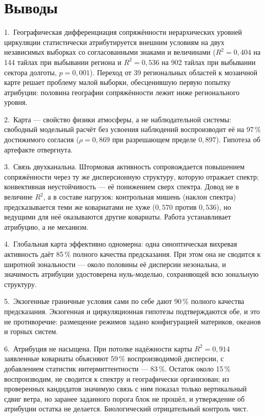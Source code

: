 \documentclass[11pt,a4paper]{article}
\begin{document}
\section{Выводы}
\label{sec:conclusion}

1.~Географическая дифференциация сопряжённости иерархических уровней циркуляции статистически атрибутируется внешним условиям на двух независимых выборках со согласованными знаками и величинами ($R^2=0{,}404$ на 144 тайлах при выбывании региона и $R^2=0{,}536$ на 902 тайлах при выбывании сектора долготы, $p=0{,}001$). Переход от 39 региональных областей к мозаичной карте решает проблему малой выборки, обесценившую первую попытку атрибуции: половина географии сопряжённости лежит ниже регионального уровня.

2.~Карта --- свойство физики атмосферы, а не наблюдательной системы: свободный модельный расчёт без усвоения наблюдений воспроизводит её на 97\,\% достижимого согласия ($\rho=0{,}869$ при разрешающем пределе $0{,}897$). Гипотеза об артефакте отвергнута.

3.~Связь двухканальна. Штормовая активность сопровождается повышением сопряжённости через ту же дисперсионную структуру, которую отражает спектр; конвективная неустойчивость --- её понижением сверх спектра. Довод не в величине $R^2$, а в составе нагрузок: контрольная мишень (наклон спектра) предсказывается теми же ковариатами не хуже ($0{,}570$ против $0{,}536$), но ведущими для неё оказываются другие ковариаты. Работа устанавливает атрибуцию, а не механизм.

4.~Глобальная карта эффективно одномерна: одна синоптическая вихревая активность даёт 85\,\% полного качества предсказания. При этом она не сводится к широтной зональности --- около половины её дисперсии незональна, и значимость атрибуции удостоверена нуль-моделью, сохраняющей всю зональную структуру.

5.~Экзогенные граничные условия сами по себе дают 90\,\% полного качества предсказания. Экзогенная и циркуляционная гипотезы подтверждаются обе, и это не противоречие: размещение режимов задано конфигурацией материков, океанов и горных систем.

6.~Атрибуция не насыщена. При потолке надёжности карты $R^2=0{,}914$ заявленные ковариаты объясняют 59\,\% воспроизводимой дисперсии, с добавлением статистик интермиттентности --- 83\,\%. Остаток около 15\,\% воспроизводим, не сводится к спектру и географически организован; из проверенных кандидатов значимую связь с ним показал только вертикальный сдвиг ветра, но заранее заданного порога блок не прошёл, и утверждение об атрибуции остатка не делается. Биологический отрицательный контроль чист.
\end{document}
